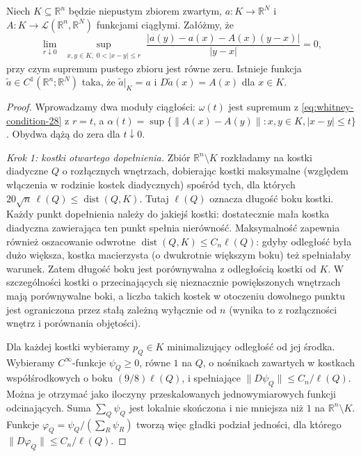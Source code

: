 \begin{lemat}
\label{lem:whitney-c1-28}
Niech $K\subseteq\mathbb R^n$ będzie niepustym zbiorem zwartym,
$a:K\to\mathbb R^N$ i
$A:K\to\mathcal L(\mathbb R^n,\mathbb R^N)$ funkcjami ciągłymi.
Załóżmy, że
\begin{equation}\label{eq:whitney-condition-28}
 \lim_{r\downarrow0}\ \sup_{\substack{x,y\in K,\;0<|x-y|\le r}}
 \frac{|a(y)-a(x)-A(x)(y-x)|}{|y-x|}=0,
\end{equation}
przy czym supremum pustego zbioru jest równe zeru.
Istnieje funkcja $\widetilde a\in C^1(\mathbb R^n;\mathbb R^N)$
taka, że $\widetilde a|_K=a$ i
$D\widetilde a(x)=A(x)$ dla $x\in K$.
\end{lemat}
\begin{proof}
Wprowadzamy dwa moduły ciągłości: $\omega(t)$ jest
supremum z \eqref{eq:whitney-condition-28} z $r=t$,
a $\alpha(t)=\sup\{\|A(x)-A(y)\|:x,y\in K,
|x-y|\le t\}$. Obydwa dążą do zera dla $t\downarrow0$.

\emph{Krok 1: kostki otwartego dopełnienia.}
Zbiór $\mathbb R^n\setminus K$ rozkładamy na kostki
diadyczne $Q$ o rozłącznych wnętrzach, dobierając
kostki maksymalne (względem włączenia w rodzinie
kostek diadycznych) spośród tych, dla których
$20\sqrt n\,\ell(Q)\le\operatorname{dist}(Q,K)$.
Tutaj $\ell(Q)$ oznacza długość boku kostki.
Każdy punkt dopełnienia należy do jakiejś kostki:
dostatecznie mała kostka diadyczna zawierająca ten
punkt spełnia nierówność. Maksymalność zapewnia
również oszacowanie odwrotne
$\operatorname{dist}(Q,K)\le C_n\ell(Q)$:
gdyby odległość była dużo większa, kostka macierzysta
(o dwukrotnie większym boku) też spełniałaby warunek.
Zatem długość boku jest porównywalna z odległością
kostki od $K$. W szczególności kostki o przecinających
się nieznacznie powiększonych wnętrzach mają
porównywalne boki, a liczba takich kostek w otoczeniu
dowolnego punktu jest ograniczona przez stałą zależną
wyłącznie od $n$ (wynika to z rozłączności wnętrz
i porównania objętości).

Dla każdej kostki wybieramy $p_Q\in K$ minimalizujący
odległość od jej środka. Wybieramy $C^\infty$-funkcje
$\psi_Q\ge0$, równe $1$ na $Q$, o nośnikach zawartych
w kostkach współśrodkowych o boku $(9/8)\ell(Q)$,
i spełniające $\|D\psi_Q\|\le C_n/\ell(Q)$.
Można je otrzymać jako iloczyny przeskalowanych
jednowymiarowych funkcji odcinających.
Suma $\sum_Q\psi_Q$ jest lokalnie skończona i nie
mniejsza niż $1$ na $\mathbb R^n\setminus K$.
Funkcje $\varphi_Q=\psi_Q/(\sum_R\psi_R)$ tworzą
więc gładki podział jedności, dla którego
$\|D\varphi_Q\|\le C_n/\ell(Q)$.


\end{proof}

